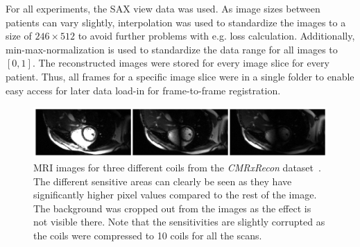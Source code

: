 For all experiments, the SAX view data was used. As image sizes between patients can vary slightly, interpolation was used to standardize the images to a size of $246 \times 512$ to avoid further problems with e.g. 
loss calculation. Additionally, min-max-normalization is used to standardize the data range for all images to $[0,1]$. The reconstructed images were stored for every image slice for every patient. Thus, all frames for a specific image slice were in a single folder to enable easy access for later data load-in for frame-to-frame registration.

\begin{figure}[h]%
	\centering
	\graphicspath{{images/}{\main/images/}}
	\includegraphics[width=\textwidth]{Coils.png} 
	\caption{MRI images for three different coils from the \emph{CMRxRecon} dataset~\cite{CMRxRecon}. The different sensitive areas can clearly be seen as they have significantly higher pixel values compared to the rest of the image. The background was cropped out from the images as the effect is not visible there. Note that the sensitivities are slightly corrupted as the coils were compressed to 10 coils for all the scans.}
	\label{fig:Coils}
\end{figure}


